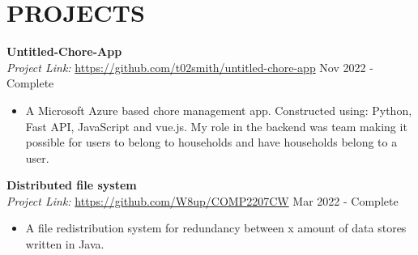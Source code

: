 \section*{PROJECTS}
\noindent
\textbf{Untitled-Chore-App} \\ %
\textit{Project Link:} \url{https://github.com/t02smith/untitled-chore-app} \hfill Nov 2022 - Complete
\begin{itemize}
    \item A Microsoft Azure based chore management app. Constructed using: Python, Fast API, JavaScript and vue.js. My role in the backend was team making it possible for users to belong to households and have households belong to a user.
\end{itemize}


\noindent
\textbf{Distributed file system}\\
\textit{Project Link:} \url{https://github.com/W8up/COMP2207CW} \hfill Mar 2022 - Complete
\begin{itemize}
    \item A file redistribution system for redundancy between x amount of data stores written in Java.
\end{itemize}